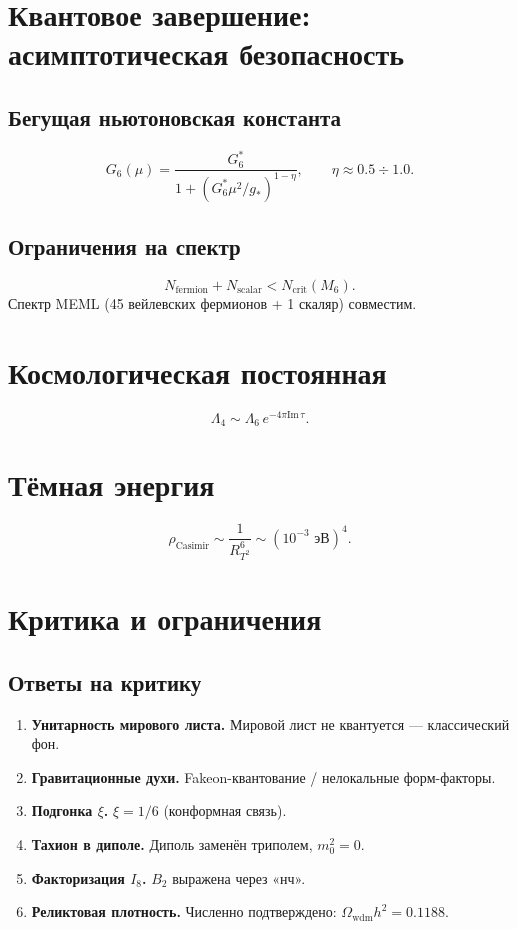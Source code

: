 \documentclass[11pt,letterpaper]{article}
\begin{document}
\section{Квантовое завершение: асимптотическая безопасность}

\subsection{Бегущая ньютоновская константа}
\begin{equation}
G_6(\mu) = \frac{G_6^*}{1 + (G_6^* \mu^2 / g_*)^{1-\eta}}, \qquad \eta \approx 0.5 \div 1.0.
\end{equation}

\subsection{Ограничения на спектр}
\begin{equation}
N_{\text{fermion}} + N_{\text{scalar}} < N_{\text{crit}}(M_6).
\end{equation}
Спектр MEML (45 вейлевских фермионов + 1 скаляр) совместим.

\section{Космологическая постоянная}
\begin{equation}
\Lambda_4 \sim \Lambda_6 \, e^{-4\pi \text{Im}\,\tau}.
\end{equation}

\section{Тёмная энергия}
\begin{equation}
\rho_{\text{Casimir}} \sim \frac{1}{R_{T^2}^6} \sim (10^{-3} \text{ эВ})^4.
\end{equation}

\section{Критика и ограничения}

\subsection{Ответы на критику}
\begin{enumerate}
\item \textbf{Унитарность мирового листа.} Мировой лист не квантуется --- классический фон.
\item \textbf{Гравитационные духи.} Fakeon-квантование / нелокальные форм-факторы.
\item \textbf{Подгонка $\xi$.} $\xi = 1/6$ (конформная связь).
\item \textbf{Тахион в диполе.} Диполь заменён триполем, $m_0^2 = 0$.
\item \textbf{Факторизация $I_8$.} $B_2$ выражена через «нч».
\item \textbf{Реликтовая плотность.} Численно подтверждено: $\Omega_{\text{wdm}} h^2 = 0.1188$.
\end{enumerate}
\end{document}
